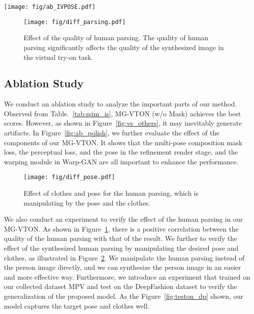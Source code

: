 \documentclass[10pt,twocolumn,letterpaper]{article}
\begin{document}
\begin{figure*}[!thp]
\centering
\texttt{[image: fig/ab\_IVPOSE.pdf]} 
\caption{Ablation study on our collected dataset MPV. Zoom in for details.}
\label{fig:ab_polish}
\vspace{-4mm}
\end{figure*}


\begin{figure}[!tp]
\centering
\texttt{[image: fig/diff\_parsing.pdf]} 
\caption{Effect of the quality of human parsing. The quality of human parsing significantly affects the quality of the synthesized image in the virtual try-on task.}
\label{fig:diff_parsing}
\vspace{-4mm}
\end{figure}



\subsection{Ablation Study}
We conduct an ablation study to analyze the important parts of our method. Observed from Table.~\ref{tab:ssim_is}, MG-VTON (w/o Mask) achieves the best scores. However, as shown in Figure~\ref{fig:vs_others}, it may inevitably generate artifacts. In Figure~\ref{fig:ab_polish}, we further evaluate the effect of the components of our MG-VTON. It shows that the multi-pose composition mask loss, the perceptual loss, and the pose in the refinement render stage, and the warping module in Warp-GAN are all important to enhance the performance.


\begin{figure}[!tp]
\centering
\texttt{[image: fig/diff\_pose.pdf]} 
\caption{Effect of clothes and pose for the human parsing, which is manipulating by the pose and the clothes. }
\label{fig:diff_pose}
\vspace{-4mm}
\end{figure}

We also conduct an experiment to verify the effect of the human parsing in our MG-VTON. As shown in Figure~\ref{fig:diff_parsing}, there is a positive correlation between the quality of the human parsing with that of the result. We further to verify the effect of the synthesized human parsing by manipulating the desired pose and clothes, as illustrated in Figure~\ref{fig:diff_pose}. 
We manipulate the human parsing instead of the person image directly, and we can synthesize the person image in an easier and more effective way. Furthermore, we introduce an experiment that trained on our collected dataset MPV and test on the DeepFashion dataset to verify the generalization of the proposed model. As the Figure~\ref{fig:teston_dp} shown, our model captures the target pose and clothes well.
\end{document}
